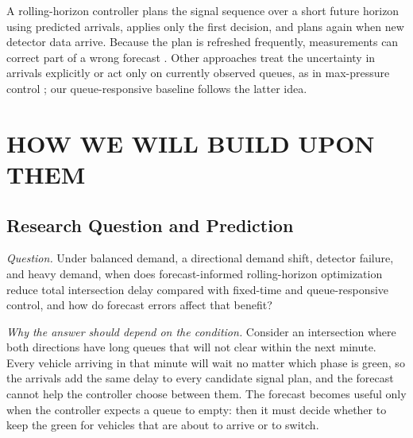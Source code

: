 \documentclass[letterpaper,12pt,conference]{ieeeconf}
\begin{document}
A rolling-horizon controller plans the signal sequence over a
short future horizon using predicted arrivals, applies only the
first decision, and plans again when new detector data arrive.
Because the plan is refreshed frequently, measurements can correct
part of a wrong forecast \cite{li2025,atef2026}. Other approaches
treat the uncertainty in arrivals explicitly \cite{jia2025} or act
only on currently observed queues, as in max-pressure control
\cite{varaiya2013}; our queue-responsive baseline follows the
latter idea.

\section{HOW WE WILL BUILD UPON THEM}

\subsection{Research Question and Prediction}

\emph{Question.} Under balanced demand, a directional demand
shift, detector failure, and heavy demand, when does
forecast-informed rolling-horizon optimization reduce total
intersection delay compared with fixed-time and queue-responsive
control, and how do forecast errors affect that benefit?

\emph{Why the answer should depend on the condition.} Consider an
intersection where both directions have long queues that will not
clear within the next minute. Every vehicle arriving in that
minute will wait no matter which phase is green, so the arrivals
add the same delay to every candidate signal plan, and the
forecast cannot help the controller choose between them. The
forecast becomes useful only when the controller expects a queue
to empty: then it must decide whether to keep the green for
vehicles that are about to arrive or to switch.
\end{document}
